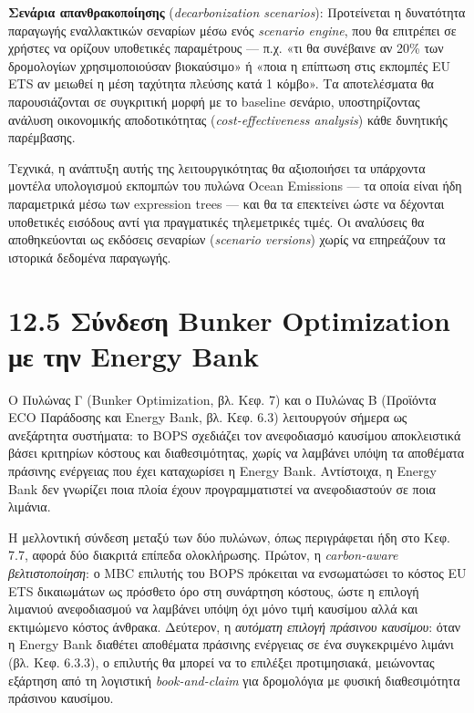 \documentclass[11pt,a4paper,greek,twoside]{template-xe}
\begin{document}
\textbf{Σενάρια απανθρακοποίησης} (\emph{decarbonization scenarios}):
Προτείνεται η δυνατότητα παραγωγής εναλλακτικών σεναρίων μέσω ενός
\emph{scenario engine}, που θα επιτρέπει σε χρήστες να ορίζουν
υποθετικές παραμέτρους --- π.χ. «τι θα συνέβαινε αν 20\% των δρομολογίων
χρησιμοποιούσαν βιοκαύσιμο» ή «ποια η επίπτωση στις εκπομπές EU ETS αν
μειωθεί η μέση ταχύτητα πλεύσης κατά 1 κόμβο». Τα αποτελέσματα θα
παρουσιάζονται σε συγκριτική μορφή με το baseline σενάριο,
υποστηρίζοντας ανάλυση οικονομικής αποδοτικότητας
(\emph{cost-effectiveness analysis}) κάθε δυνητικής παρέμβασης.

Τεχνικά, η ανάπτυξη αυτής της λειτουργικότητας θα αξιοποιήσει τα
υπάρχοντα μοντέλα υπολογισμού εκπομπών του πυλώνα Ocean Emissions --- τα
οποία είναι ήδη παραμετρικά μέσω των expression trees --- και θα τα
επεκτείνει ώστε να δέχονται υποθετικές εισόδους αντί για πραγματικές
τηλεμετρικές τιμές. Οι αναλύσεις θα αποθηκεύονται ως εκδόσεις σεναρίων
(\emph{scenario versions}) χωρίς να επηρεάζουν τα ιστορικά δεδομένα
παραγωγής.

\section{12.5 Σύνδεση Bunker Optimization με την Energy
Bank}\label{ux3c3ux3cdux3bdux3b4ux3b5ux3c3ux3b7-bunker-optimization-ux3bcux3b5-ux3c4ux3b7ux3bd-energy-bank}

Ο Πυλώνας Γ (Bunker Optimization, βλ. Κεφ. 7) και ο Πυλώνας Β (Προϊόντα
ECO Παράδοσης και Energy Bank, βλ. Κεφ. 6.3) λειτουργούν σήμερα ως
ανεξάρτητα συστήματα: το BOPS σχεδιάζει τον ανεφοδιασμό καυσίμου
αποκλειστικά βάσει κριτηρίων κόστους και διαθεσιμότητας, χωρίς να
λαμβάνει υπόψη τα αποθέματα πράσινης ενέργειας που έχει καταχωρίσει η
Energy Bank. Αντίστοιχα, η Energy Bank δεν γνωρίζει ποια πλοία έχουν
προγραμματιστεί να ανεφοδιαστούν σε ποια λιμάνια.

Η μελλοντική σύνδεση μεταξύ των δύο πυλώνων, όπως περιγράφεται ήδη στο
Κεφ. 7.7, αφορά δύο διακριτά επίπεδα ολοκλήρωσης. Πρώτον, η
\emph{carbon-aware βελτιστοποίηση}: ο MBC επιλυτής του BOPS πρόκειται να
ενσωματώσει το κόστος EU ETS δικαιωμάτων ως πρόσθετο όρο στη συνάρτηση
κόστους, ώστε η επιλογή λιμανιού ανεφοδιασμού να λαμβάνει υπόψη όχι μόνο
τιμή καυσίμου αλλά και εκτιμώμενο κόστος άνθρακα. Δεύτερον, η
\emph{αυτόματη επιλογή πράσινου καυσίμου}: όταν η Energy Bank διαθέτει
αποθέματα πράσινης ενέργειας σε ένα συγκεκριμένο λιμάνι (βλ. Κεφ.
6.3.3), ο επιλυτής θα μπορεί να το επιλέξει προτιμησιακά, μειώνοντας
εξάρτηση από τη λογιστική \emph{book-and-claim} για δρομολόγια με φυσική
διαθεσιμότητα πράσινου καυσίμου.
\end{document}
